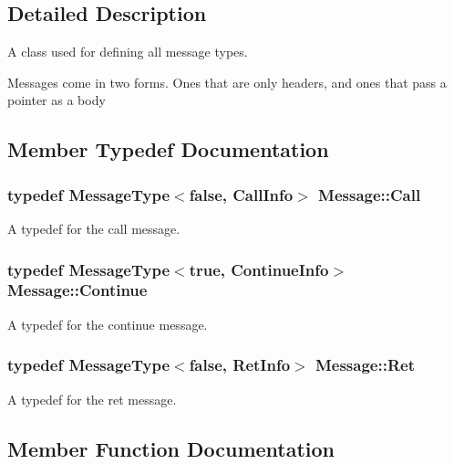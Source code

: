 \subsection{Detailed Description}
A class used for defining all message types. 

Messages come in two forms. Ones that are only headers, and ones that pass a pointer as a body 

\subsection{Member Typedef Documentation}
\subsubsection[{\texorpdfstring{Call}{Call}}]{\setlength{\rightskip}{0pt plus 5cm}typedef Message\+Type$<$false, Call\+Info$>$ {\bf Message\+::\+Call}}\hypertarget{class_message_a0fd0ed431cb0d672045d09368a5d2126}{}\label{class_message_a0fd0ed431cb0d672045d09368a5d2126}


A typedef for the call message. 

\subsubsection[{\texorpdfstring{Continue}{Continue}}]{\setlength{\rightskip}{0pt plus 5cm}typedef Message\+Type$<$true, Continue\+Info$>$ {\bf Message\+::\+Continue}}\hypertarget{class_message_a04de61b84a209cdf372b6f53f3adf7c4}{}\label{class_message_a04de61b84a209cdf372b6f53f3adf7c4}


A typedef for the continue message. 

\subsubsection[{\texorpdfstring{Ret}{Ret}}]{\setlength{\rightskip}{0pt plus 5cm}typedef Message\+Type$<$false, Ret\+Info$>$ {\bf Message\+::\+Ret}}\hypertarget{class_message_a146628035f5a0723cb04f7a328858e34}{}\label{class_message_a146628035f5a0723cb04f7a328858e34}


A typedef for the ret message. 



\subsection{Member Function Documentation}
